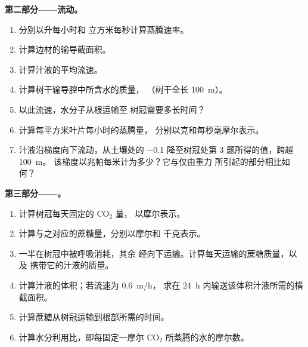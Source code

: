 \begin{problem}
\medskip
\noindent\textbf{第二部分——流动。}
\begin{enumerate}[resume]
  \item 分别以升每小时和
        立方米每秒计算蒸腾速率。
  \item 计算边材的输导截面积。
  \item 计算汁液的平均流速。
  \item 计算树干输导腔中所含水的质量，
        （树干全长 \qty{100}{m}）。
  \item 以此流速，水分子从根运输至
        树冠需要多长时间？
  \item 计算每平方米叶片每小时的蒸腾量，
        分别以克和每秒毫摩尔表示。
  \item 汁液沿梯度向下流动，从土壤处的 \qty{-0.1}{}
        降至树冠处第 3 题所得的值，跨越 \qty{100}{m}。
        该梯度以兆帕每米计为多少？它与仅由重力
        所引起的部分相比如何？
\end{enumerate}

\medskip
\noindent\textbf{第三部分——。}
\begin{enumerate}[resume]
  \item 计算树冠每天固定的 $\mathrm{CO_2}$ 量，
        以摩尔表示。
  \item 计算与之对应的蔗糖量，分别以摩尔和
        千克表示。
  \item 一半在树冠中被呼吸消耗，其余
        经向下运输。计算每天运输的蔗糖质量，以及
        携带它的汁液的质量。
  \item 计算汁液的体积；若流速为 \qty{0.6}{m/h}，
        求在 \qty{24}{h} 内输送该体积汁液所需的横截面积。
  \item 计算蔗糖从树冠运输到根部所需的时间。
  \item 计算水分利用比，即每固定一摩尔
        $\mathrm{CO_2}$ 所蒸腾的水的摩尔数。
\end{enumerate}


\end{problem}
